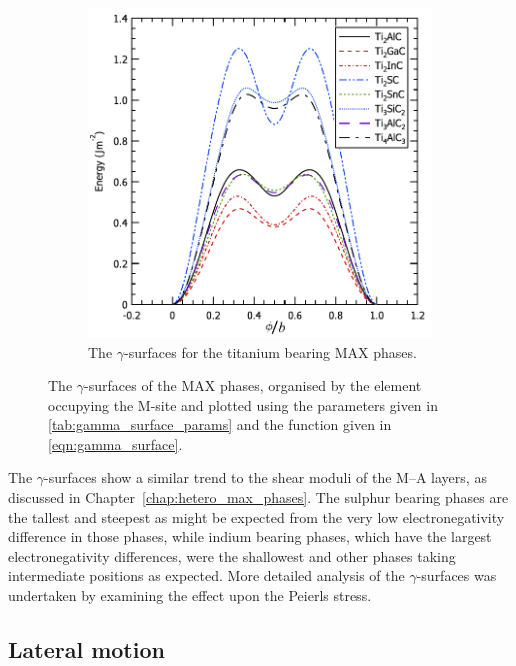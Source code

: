 \begin{figure}
\begin{subfigure}{7cm}
\centering
\includegraphics[width=\textwidth]{Ti_gamma_surfaces}
\caption{The $\gamma$-surfaces for the titanium bearing MAX phases.\label{fig:Ti_gamma_surfaces}}
\end{subfigure}

\captionsetup{width=12cm}
\caption[The \texorpdfstring{$\gamma$}{gamma}-surfaces of the MAX phases.]{The $\gamma$-surfaces of the MAX phases, organised by the element occupying the M-site and plotted using the parameters given in \autoref{tab:gamma_surface_params} and the function given in \autoref{eqn:gamma_surface}. \label{fig:gamma_surfaces}}
\end{figure}


The $\gamma$-surfaces show a similar trend to the shear moduli of the M--A layers, as discussed in Chapter~\ref{chap:hetero_max_phases}. The sulphur bearing phases are the tallest and steepest as might be expected from the very low electronegativity difference in those phases, while indium bearing phases, which have the largest electronegativity differences, were the shallowest and other phases taking intermediate positions as expected. More detailed analysis of the $\gamma$-surfaces was undertaken by examining the effect upon the Peierls stress.


\subsection{Lateral motion}



